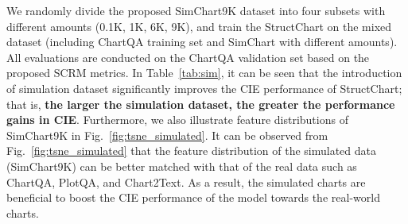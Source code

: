 \documentclass{article} \usepackage{iclr2024_conference,times}
\begin{document}
{We randomly divide the proposed SimChart9K dataset into four subsets with different amounts (0.1K, 1K, 6K, 9K), and train the StructChart on the mixed dataset (including ChartQA training set and SimChart with different amounts). All evaluations are conducted on the ChartQA validation set based on the proposed SCRM metrics. In Table~\ref{tab:sim}, it can be seen that the introduction of simulation dataset significantly improves the CIE performance of StructChart; that is, \textbf{the larger the simulation dataset, the greater the performance gains in CIE}. Furthermore, we also illustrate feature distributions of SimChart9K in Fig.~\ref{fig:tsne_simulated}. It can be observed from Fig.~\ref{fig:tsne_simulated} that the feature distribution of the simulated data (SimChart9K) can be better matched with that of the real data such as ChartQA, PlotQA, and Chart2Text. As a result, the simulated charts are beneficial to boost the CIE performance of the model towards the real-world charts.

\begin{table}[!tb]
\vspace{-8pt}
\centering
\caption{ChartQA perception results by scaling up the simulation data (from 0.1K to 9K).}
\vspace{-6pt}
\end{table}}
\end{document}
